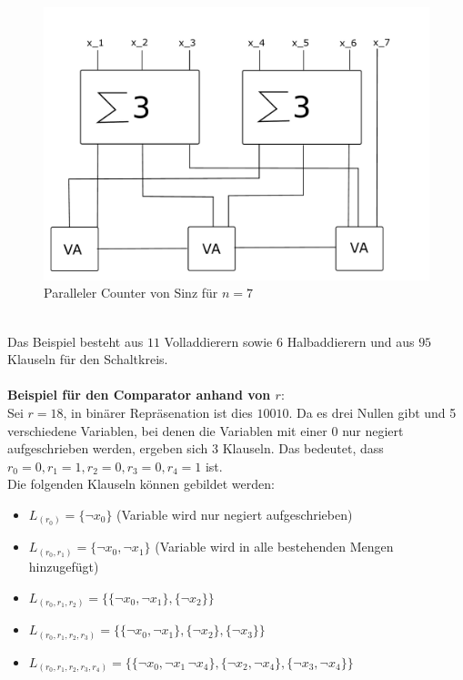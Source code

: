 \documentclass[a4,abstract=on]{scrartcl}
\begin{document}
\begin{figure}[H]
\centering
\includegraphics[width=\textwidth]{bsp_Sinz_fein.pdf}
\caption{Paralleler Counter von Sinz für $n=7$}
\label{fig:sinz_counter_para_bsp}
\end{figure}
\ \\
Das Beispiel besteht aus $11$ Volladdierern sowie 6 Halbaddierern und aus $95$ Klauseln für den Schaltkreis.\\
\ \\
\textbf{Beispiel für den Comparator anhand von $r$}:\\
Sei $r = 18$, in binärer Repräsenation ist dies $10010$. Da es drei Nullen gibt und 5 verschiedene Variablen, bei denen die Variablen mit einer $0$ nur negiert aufgeschrieben werden, ergeben sich 3 Klauseln. Das bedeutet, dass $r_0 = 0, r_1 = 1, r_2 = 0, r_3 = 0, r_4 = 1$ ist.\\
Die folgenden Klauseln können gebildet werden:\\
\begin{itemize}
\item $ L_{(r_0)}=\{\neg x_0\}$ (Variable wird nur negiert aufgeschrieben)
\item $ L_{(r_0,r_1)}=\{\neg x_0,\neg x_1\}$ (Variable wird in alle bestehenden Mengen hinzugefügt)
\item $ L_{(r_0,r_1,r_2)}=\{\{\neg x_0, \neg x_1\},\{\neg x_2\}\}$
\item $ L_{(r_0,r_1,r_2,r_3)}=\{\{\neg x_0, \neg x_1\},\{\neg x_2\}, \{\neg x_3\}\}$
\item $ L_{(r_0,r_1,r_2,r_3,r_4)}=\{\{\neg x_0, \neg x_1\, \neg x_4\},\{\neg x_2, \neg x_4\}, \{\neg x_3, \neg x_4\}\}$
\end{itemize}
\end{document}
